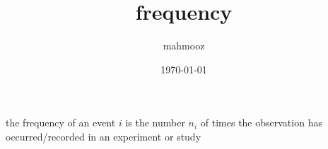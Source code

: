 \documentclass[11pt]{article}
\author{mahmooz}
\date{\today}
\title{frequency}
\begin{document}
\maketitle
\tableofcontents

the frequency of an event \(i\) is the number \(n_{i}\) of times the observation has occurred/recorded in an experiment or study
\end{document}
